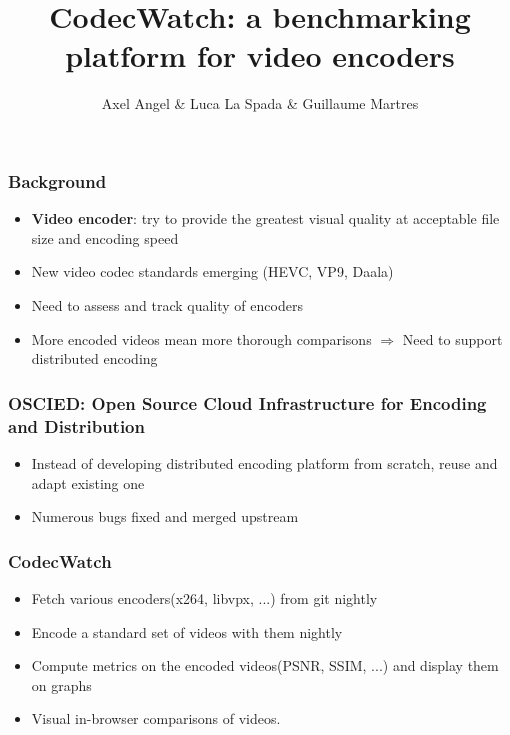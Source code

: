 \documentclass{beamer}
\title{CodecWatch: a benchmarking platform for video encoders}
\author{Axel Angel \& Luca La Spada \& Guillaume Martres}
\begin{document}
\frame{\titlepage}

\begin{frame}
  \frametitle{Background}
  \begin{itemize}
    \item \textbf{Video encoder}: try to provide the greatest visual quality at acceptable
      file size and encoding speed
    \item New video codec standards emerging (HEVC, VP9, Daala)
    \item Need to assess and track quality of encoders
    \item More encoded videos mean more thorough comparisons $\Rightarrow$
      Need to support distributed encoding
  \end{itemize}
\end{frame}

\begin{frame}
  \frametitle{OSCIED: Open Source Cloud Infrastructure for Encoding and Distribution}
  \begin{itemize}
    \item Instead of developing distributed encoding platform from scratch,
      reuse and adapt existing one
    \item Numerous bugs fixed and merged upstream
  \end{itemize}
\end{frame}

\begin{frame}
  \frametitle{CodecWatch}
  \begin{itemize}
    \item Fetch various encoders(x264, libvpx, ...) from git nightly
    \item Encode a standard set of videos with them nightly
    \item Compute metrics on the encoded videos(PSNR, SSIM, ...) and display
      them on graphs
    \item Visual in-browser comparisons of videos.
  \end{itemize}
\end{frame}
\end{document}
